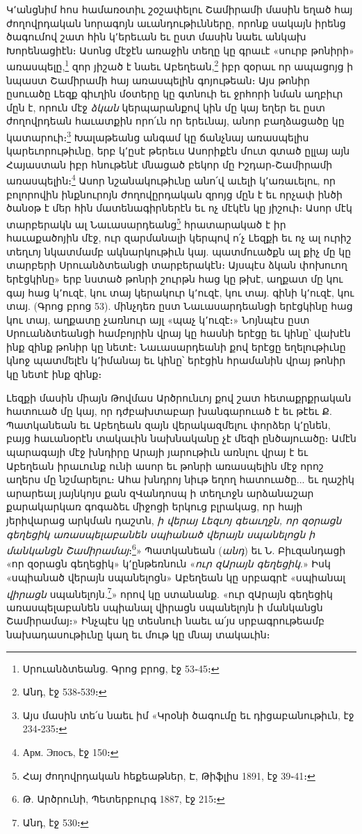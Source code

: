 \documentclass{article}
\begin{document}
{Կ՚անցնիմ հոս համառօտիւ շօշափելու Շամիրամի մասին եղած հայ ժողովրդական նորագոյն աւանդութիւնները, որոնք սակայն իրենց ծագումով շատ հին կ՚երեւան եւ ըստ մասին նաեւ անկախ Խորենացիէն։ Ասոնց մէջէն առաջին տեղը կը գրաւէ «սուրբ թոնիրի» առասպելը,\footnote{Սրուանձտեանց. Գրոց բրոց, էջ 53֊45։} զոր յիշած է նաեւ Աբեղեան,\footnote{Անդ, էջ 538֊539։} իբր զօրաւ որ ապացոյց ի նպաստ Շամիրամի հայ առասպելին գոյութեան։ Այս թոնիր ըսուածը Լեզք գիւղին մօտերը կը գտնուի եւ ջրհորի նման աղբիւր մըն է, որուն մէջ \emph{ձկան} կերպարանքով կին մը կայ եղեր եւ ըստ ժողովրդեան հաւատքին որո՛ւն որ երեւնայ, անոր բաղձացածը կը կատարուի։\footnote{Այս մասին տե՛ս նաեւ իմ «Կրօնի ծագումը եւ դիցաբանութիւն, էջ 234֊235։} Խալաթեանց անգամ կը ճանչնայ առասպելիս կարեւորութիւնը, երբ կ՚ըսէ թերեւս Ասորիքէն մուտ գտած ըլլայ այն Հայաստան իբր հնութենէ մնացած բեկոր մը Իշդար֊Շամիրամի առասպելին։\footnote{Арм. Эпосъ, էջ 150։} Ասոր նշանակութիւնը անո՛վ աւելի կ՚առաւելու, որ բոլորովին ինքնուրոյն ժողովըրդական զրոյց մըն է եւ որչափ ինծի ծանօթ է մեր հին մատենագիրներէն եւ ոչ մէկէն կը յիշուի։ Ասոր մէկ տարբերակն ալ Նաւասարդեանց\footnote{Հայ ժողովրդական հեքեաթներ, Է, Թիֆլիս 1891, էջ 39֊41։} հրատարակած է իր հաւաքածոյին մէջ, ուր զարմանալի կերպով ո՛չ Լեզքի եւ ոչ ալ ուրիշ տեղւոյ նկատմամբ ակնարկութիւն կայ. պատմուածքն ալ քիչ մը կը տարբերի Սրուանձտեանցի տարբերակէն։ Այսպէս ձկան փոխուող երէցկինը» երբ նստած թոնրի շուրթն հաց կը թխէ, աղքատ մը կու գայ հաց կ՚ուզէ, կու տայ կերակուր կ՚ուզէ, կու տայ. գինի կ՚ուզէ, կու տայ. (Գրոց բրոց 53). մինչդեռ ըստ Նաւասարդեանցի երէցկինը հաց կու տայ, աղքատը չառնուր այլ «պաչ կ՚ուզէ։» Նոյնպէս ըստ Սրուանձտեանցի համբոյրին վրայ կը հասնի երէցը եւ կինը՝ վախէն ինք զինք թոնիր կը նետէ։ Նաւասարդեանի քով երէցը եղելութիւնը կնոջ պատմելէն կ՚իմանայ եւ կինը՝ երէցին հրամանին վրայ թոնիր կը նետէ ինք զինք։

Լեզքի մասին միայն Թովմաս Արծրունւոյ քով շատ հետաքրքրական հատուած մը կայ, որ դժբախտաբար խանգարուած է եւ թէեւ Ք. Պատկանեան եւ Աբեղեան զայն վերակազմելու փորձեր կ՚ընեն, բայց հաւանօրէն տակաւին նախնականը չէ մեզի ընծայուածը։ Ամէն պարագայի մէջ խնդիրը Արայի յարութիւն առնլու վրայ է եւ Աբեղեան իրաւունք ունի ասոր եւ թոնրի առասպելին մէջ որոշ աղերս մը նշմարելու։ Ահա խնդրոյ նիւթ եղող հատուածը... եւ ղաշիկ արարեալ յայնկոյս քան զՎանդոսպ ի տեղւոջն արձանաշար քարակարկառ գոգաձեւ միջոցի երկուց բլրակաց, որ հայի յերիվարաց արկման դաշտն, \emph{ի վերայ Լեզւոյ գեաւղջն, որ զօրացն գեղեցիկ առասպելաբանեն սպիանած վերայն սպանելոցն ի մանկանցն Շամիրամայ}։\footnote{Թ. Արծրունի, Պետերբուրգ 1887, էջ 215։}» Պատկանեան (\emph{անդ}) եւ Ն. Բիւզանդացի «որ զօրացն գեղեցիկ» կ՚ընթեռնուն «\emph{ուր զԱրայն գեղեցիկ}.» Իսկ «սպիանած վերայն սպանելոցն» Աբեղեան կը սրբագրէ «սպիանալ \emph{վիրացն} սպանելոյն.\footnote{Անդ, էջ 530։}» որով կը ստանանք. «ուր զԱրայն գեղեցիկ առասպելաբանեն սպիանալ վիրացն սպանելոյն ի մանկանցն Շամիրամայ։» Ինչպէս կը տեսնուի նաեւ ա՛յս սրբագրութեամբ նախադասութիւնը կաղ եւ մութ կը մնայ տակաւին։

}
\end{document}
